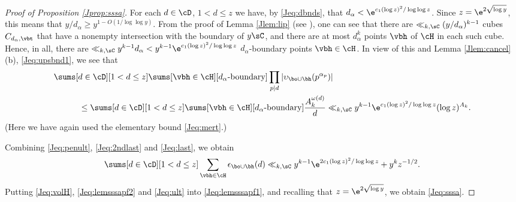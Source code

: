 \documentclass[12pt, reqno, twoside, letterpaper]{amsart}
\begin{document}
\begin{jetsam}
\begin{proof}[Proof of Proposition \ref{Jprop:sssa}]
For each $d \in \cD$, $1 < d \le z$ we have, by \eqref{Jeq:dbnds}, 
that $d_{\alpha} < \e^{c_1(\log z)^2/\log \log z}$.
%
Since $z = \e^{2\sqrt{\log y}}$, this means that 
$y/d_{\alpha} \ge y^{1 - O(1/\log\log y)}$.
%
From the proof of Lemma \ref{Jlem:lip} (see 
\cite[pp.\ 128--129]{LAN:94}), one can see that there are 
$\ll_{k,\sC} (y/d_{\alpha})^{k - 1}$ cubes $C_{d_{\alpha},\vbt}$ 
that have a nonempty intersection with the boundary of $y\sC$,  
and there are at most $d_{\alpha}^k$ points $\vbh$ of $\cH$ in 
each such cube.
%
Hence, in all, there are 
$
 \ll_{k,\sC} 
  y^{k - 1}d_{\alpha} < y^{k - 1}\e^{c_1(\log z)^2/\log \log z}
$ 
$d_{\alpha}$-boundary points $\vbh \in \cH$.
%
In view of this and Lemma \ref{Jlem:cancel} (b), 
\eqref{Jeq:upsbnd1}, we see that 
\begin{align}
 \label{Jeq:last}
  \begin{split}
 & 
  \sums[d \in \cD][1 < d \le z]
   \sums[\vbh \in \cH][\text{$d_{\alpha}$-boundary}]
    \prod_{p \mid d} |\upsilon_{\bo \cup \bh}(p^{\alpha_p})|
 \\
 & \hspace{30pt}
     \le 
      \sums[d \in \cD][1 < d \le z] 
       \sums[\vbh \in \cH][\text{$d_{\alpha}$-boundary}]
        \frac{A_k^{\omega(d)}}{d}
         \ll_{k,\sC}
          y^{k - 1}\e^{c_1(\log z)^2/\log\log z}(\log z)^{A_k}.
  \end{split}
\end{align}
%
(Here we have again used the elementary bound \eqref{Jeq:mert}.)

Combining \eqref{Jeq:penult}, \eqref{Jeq:2ndlast} and 
\eqref{Jeq:last}, we obtain 
\begin{equation}
 \label{Jeq:ult}
  \sums[d \in \cD][1 < d \le z] 
   \sum_{\vbh \in \cH}
    \epsilon_{\bo \cup \bh}(d) 
     \ll_{k,\sC}
      y^{k - 1}\e^{2c_1(\log z)^2/\log\log z} 
       + 
        y^kz^{-1/2}. 
\end{equation}
%
Putting \eqref{Jeq:volH}, \eqref{Jeq:lemsssapf2} and \eqref{Jeq:ult} 
into \eqref{Jeq:lemsssapf1}, and recalling that 
$z = \e^{2\sqrt{\log y}}$, we obtain \eqref{Jeq:sssa}.
\end{proof}

\end{jetsam}
\end{document}
